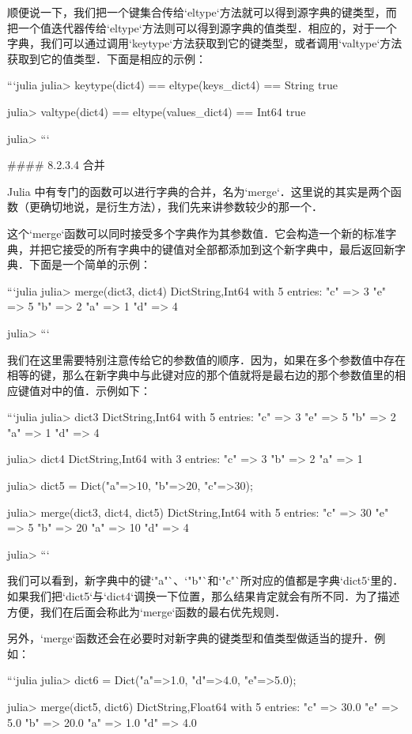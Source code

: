 顺便说一下，我们把一个键集合传给`eltype`方法就可以得到源字典的键类型，而把一个值迭代器传给`eltype`方法则可以得到源字典的值类型．相应的，对于一个字典，我们可以通过调用`keytype`方法获取到它的键类型，或者调用`valtype`方法获取到它的值类型．下面是相应的示例：

```julia 
julia> keytype(dict4) == eltype(keys_dict4) == String
true

julia> valtype(dict4) == eltype(values_dict4) == Int64
true

julia> 
```

#### 8.2.3.4 合并

Julia 中有专门的函数可以进行字典的合并，名为`merge`．这里说的其实是两个函数（更确切地说，是衍生方法），我们先来讲参数较少的那一个．

这个`merge`函数可以同时接受多个字典作为其参数值．它会构造一个新的标准字典，并把它接受的所有字典中的键值对全部都添加到这个新字典中，最后返回新字典．下面是一个简单的示例：

```julia
julia> merge(dict3, dict4)
Dict{String,Int64} with 5 entries:
  "c" => 3
  "e" => 5
  "b" => 2
  "a" => 1
  "d" => 4

julia> 
```

我们在这里需要特别注意传给它的参数值的顺序．因为，如果在多个参数值中存在相等的键，那么在新字典中与此键对应的那个值就将是最右边的那个参数值里的相应键值对中的值．示例如下：

```julia
julia> dict3
Dict{String,Int64} with 5 entries:
  "c" => 3
  "e" => 5
  "b" => 2
  "a" => 1
  "d" => 4

julia> dict4
Dict{String,Int64} with 3 entries:
  "c" => 3
  "b" => 2
  "a" => 1

julia> dict5 = Dict("a"=>10, "b"=>20, "c"=>30);

julia> merge(dict3, dict4, dict5)
Dict{String,Int64} with 5 entries:
  "c" => 30
  "e" => 5
  "b" => 20
  "a" => 10
  "d" => 4

julia> 
```

我们可以看到，新字典中的键`"a"`、`"b"`和`"c"`所对应的值都是字典`dict5`里的．如果我们把`dict5`与`dict4`调换一下位置，那么结果肯定就会有所不同．为了描述方便，我们在后面会称此为`merge`函数的最右优先规则．

另外，`merge`函数还会在必要时对新字典的键类型和值类型做适当的提升．例如：

```julia
julia> dict6 = Dict("a"=>1.0, "d"=>4.0, "e"=>5.0);

julia> merge(dict5, dict6)
Dict{String,Float64} with 5 entries:
  "c" => 30.0
  "e" => 5.0
  "b" => 20.0
  "a" => 1.0
  "d" => 4.0

